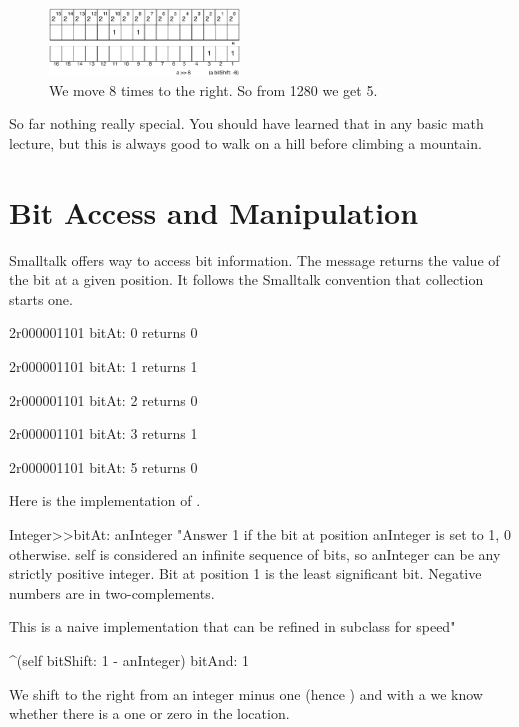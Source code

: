 \documentclass[a4paper,10pt,twoside]{book}
\begin{document}
\begin{figure}[h]
\begin{center}
\includegraphics[width=0.45\textwidth]{16bits-1280shifted8}
\caption{We move 8 times to the right. So from 1280 we get 5.\label{16bits-1280shifted8}}
\end{center}
\end{figure}

So far nothing really special. You should have learned that in any basic math lecture, but this is always good 
to walk on a hill before climbing a mountain.  



\section{Bit Access and Manipulation}
Smalltalk offers way to access bit information. The message  returns the value of the bit at a given position. It follows the Smalltalk convention that collection starts one. 


\begin{code}{}
2r000001101 bitAt: 0
	returns 0 
	
2r000001101 bitAt: 1
	returns 1 
	
2r000001101 bitAt: 2
	returns 0 
			
2r000001101 bitAt: 3
	returns 1
	 
2r000001101 bitAt: 5
	returns 0 	 
\end{code}

Here is the implementation of . 

\begin{code}{}
Integer>>bitAt: anInteger
	"Answer 1 if the bit at position anInteger is set to 1, 0 otherwise.
	self is considered an infinite sequence of bits, so anInteger can be any strictly positive integer.
	Bit at position 1 is the least significant bit.
	Negative numbers are in two-complements.
	
	This is a naive implementation that can be refined in subclass for speed"
	
	^(self bitShift: 1 - anInteger) bitAnd: 1
\end{code}

We shift to the right from an integer minus one (hence )
and with a  we know whether there is a one or zero in the location.
\end{document}
